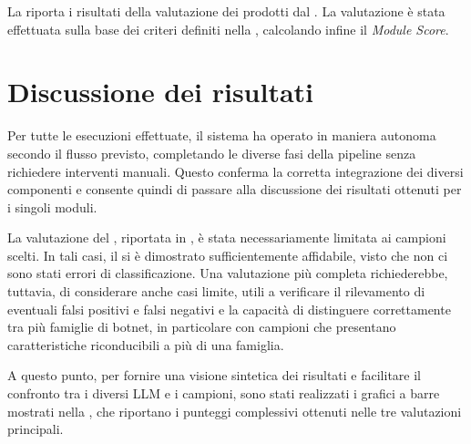 \begin{table}[t]
    \centering
    \caption[Risultati della valutazione della \reversing{}]{Risultati della valutazione della \reversing{}.}
    \label{tab:reversing_scores}
\end{table}

La  riporta i risultati della valutazione dei \capture{} prodotti dal \codeagent{}. La valutazione è stata effettuata sulla base dei criteri definiti nella , calcolando infine il \emph{Module Score}.

\begin{table}[t]
    \centering
    \caption[Risultati della valutazione dei \capture{}]{Risultati della valutazione dei \capture{}.}
    \label{tab:module_scores}
\end{table}

\section{Discussione dei risultati} %

Per tutte le esecuzioni effettuate, il sistema ha operato in maniera autonoma secondo il flusso previsto, completando le diverse fasi della pipeline senza richiedere interventi manuali. Questo conferma la corretta integrazione dei diversi componenti e consente quindi di passare alla discussione dei risultati ottenuti per i singoli moduli.

La valutazione del \classifier{}, riportata in , è stata necessariamente limitata ai campioni scelti. In tali casi, il \classifier{} si è dimostrato sufficientemente affidabile, visto che non ci sono stati errori di classificazione. Una valutazione più completa richiederebbe, tuttavia, di considerare anche casi limite, utili a verificare il rilevamento di eventuali falsi positivi e falsi negativi e la capacità di distinguere correttamente tra più famiglie di botnet, in particolare con campioni che presentano caratteristiche riconducibili a più di una famiglia. %

A questo punto, per fornire una visione sintetica dei risultati e facilitare il confronto tra i diversi LLM e i campioni, sono stati realizzati i grafici a barre mostrati nella , che riportano i punteggi complessivi ottenuti nelle tre valutazioni principali.

